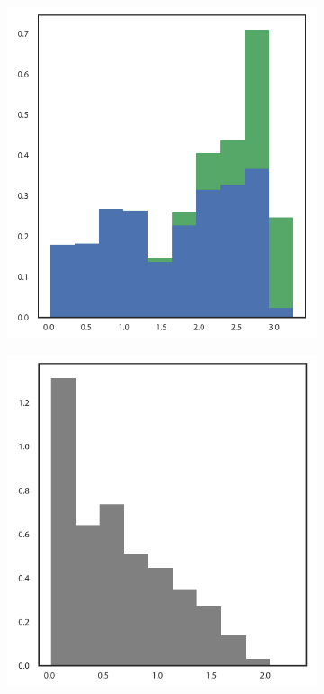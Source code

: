 \begin{figure}[h!]
\begin{subfigure}[t]{0.15\textwidth}
\label{fig:lorenz_somvae}
\end{subfigure}
    \begin{subfigure}[t]{0.15\textwidth}
\centering
\includegraphics[scale=0.22]{lorenz/k_means.pdf}
\label{fig:lorenz_kmeans}
\end{subfigure}
    \begin{subfigure}[t]{0.15\textwidth}
\centering
\includegraphics[scale=0.22]{lorenz/simulated.pdf}
\label{fig:lorenz_simulated}
\end{subfigure}


\end{figure}
